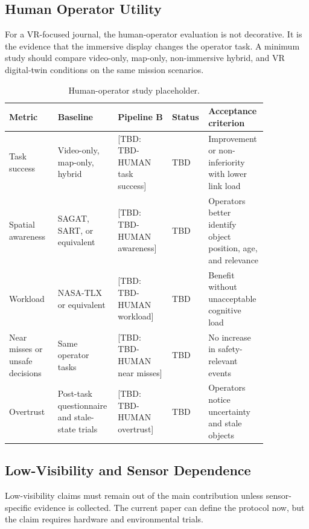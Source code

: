 \documentclass[11pt,a4paper]{article}
\newcommand{\tbd}[1]{\textcolor{publicationred}{[TBD: #1]}}
\begin{document}
\subsection{Human Operator Utility}

For a VR-focused journal, the human-operator evaluation is not decorative. It is the evidence that the immersive display changes the operator task. A minimum study should compare video-only, map-only, non-immersive hybrid, and VR digital-twin conditions on the same mission scenarios.

\begin{table}[H]
\centering
\small
\caption{Human-operator study placeholder.}
\label{tab:human-placeholder}
\begin{tabular}{@{}L{0.18\linewidth}L{0.21\linewidth}L{0.20\linewidth}L{0.08\linewidth}L{0.18\linewidth}@{}}
\toprule
Metric & Baseline & Pipeline B & Status & Acceptance criterion \\
\midrule
Task success & Video-only, map-only, hybrid & \tbd{TBD-HUMAN task success} & TBD & Improvement or non-inferiority with lower link load \\
Spatial awareness & SAGAT, SART, or equivalent & \tbd{TBD-HUMAN awareness} & TBD & Operators better identify object position, age, and relevance \\
Workload & NASA-TLX or equivalent & \tbd{TBD-HUMAN workload} & TBD & Benefit without unacceptable cognitive load \\
Near misses or unsafe decisions & Same operator tasks & \tbd{TBD-HUMAN near misses} & TBD & No increase in safety-relevant events \\
Overtrust & Post-task questionnaire and stale-state trials & \tbd{TBD-HUMAN overtrust} & TBD & Operators notice uncertainty and stale objects \\
\bottomrule
\end{tabular}
\normalsize
\end{table}

\subsection{Low-Visibility and Sensor Dependence}

Low-visibility claims must remain out of the main contribution unless sensor-specific evidence is collected. The current paper can define the protocol now, but the claim requires hardware and environmental trials.
\end{document}
